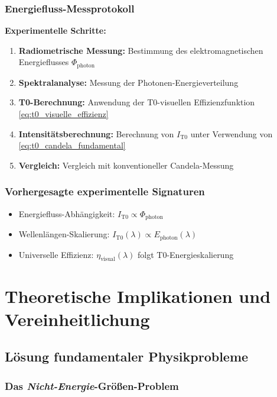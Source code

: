 \documentclass[12pt,a4paper]{article}
\newcommand{\etavis}{\eta_{\text{visual}}}
\newcommand{\Phiphoton}{\Phi_{\text{photon}}}
\begin{document}
	\subsubsection{Energiefluss-Messprotokoll}
	\label{subsubsec:candela_energie_protokoll}
	
	\textbf{Experimentelle Schritte:}
	\begin{enumerate}
		\item \textbf{Radiometrische Messung:} Bestimmung des elektromagnetischen Energieflusses $\Phiphoton$
		\item \textbf{Spektralanalyse:} Messung der Photonen-Energieverteilung
		\item \textbf{T0-Berechnung:} Anwendung der T0-visuellen Effizienzfunktion \cref{eq:t0_visuelle_effizienz}
		\item \textbf{Intensitätsberechnung:} Berechnung von $I_{\text{T0}}$ unter Verwendung von \cref{eq:t0_candela_fundamental}
		\item \textbf{Vergleich:} Vergleich mit konventioneller Candela-Messung
	\end{enumerate}
	
	\subsubsection{Vorhergesagte experimentelle Signaturen}
	\label{subsubsec:candela_experimentelle_signaturen}
	
	\begin{itemize}
		\item Energiefluss-Abhängigkeit: $I_{\text{T0}} \propto \Phiphoton$
		\item Wellenlängen-Skalierung: $I_{\text{T0}}(\lambda) \propto E_{\text{photon}}(\lambda)$
		\item Universelle Effizienz: $\etavis(\lambda)$ folgt T0-Energieskalierung
	\end{itemize}
	
	\section{Theoretische Implikationen und Vereinheitlichung}
	\label{sec:theoretische_implikationen}
	
	\subsection{Lösung fundamentaler Physikprobleme}
	\label{subsec:loesung_fundamentaler_probleme}
	
	\subsubsection{Das \textit{Nicht-Energie}-Größen-Problem}
	\label{subsubsec:nicht_energie_problem_geloest}
	
\end{document}
